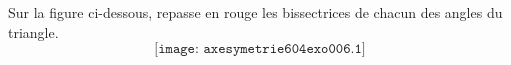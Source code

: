 Sur la figure ci-dessous, repasse en rouge les bissectrices de chacun des angles du triangle.
\[\texttt{[image: axesymetrie604exo006.1]}\]